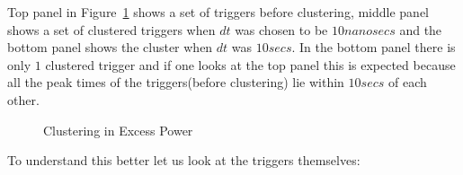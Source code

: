 \documentclass{article}
\begin{document}
Top panel in Figure~\ref{fig:checkcluster}  shows a set of triggers before
clustering,  middle panel shows a set of clustered triggers when $dt$ was
chosen to be $10  nanosecs$ and the bottom panel shows the cluster when
$dt$ was $10  secs$. In the bottom panel there is only $1$ clustered
trigger and if one looks at the top panel this is expected because all the
peak  times of the triggers(before clustering)  lie within $10  secs$ of
each other.
\begin{figure}
\centering
{}
\caption{Clustering in Excess Power}
\label{fig:checkcluster}
\end{figure}

To understand this better let us look at the triggers themselves:

\vspace{0.1 in}
\end{document}
